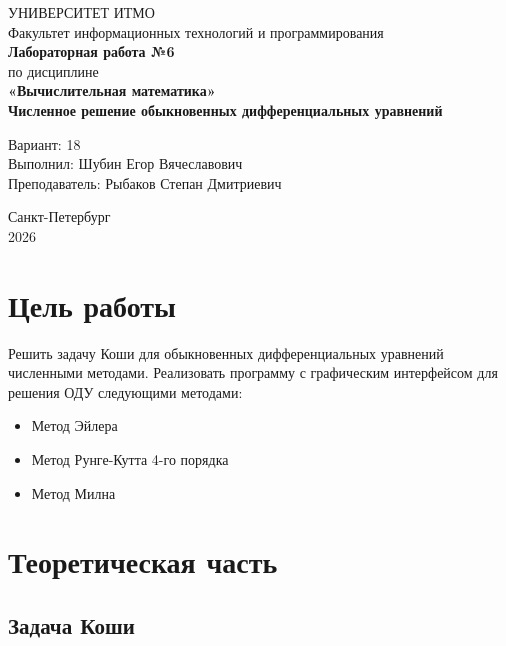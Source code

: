 \documentclass[12pt,a4paper]{article}
\begin{document}
\begin{titlepage}
    \centering
    \vspace*{2cm}
    
    {\Large УНИВЕРСИТЕТ ИТМО}\\[0.5cm]
    {\large Факультет информационных технологий и программирования}\\[2cm]
    
    {\LARGE \textbf{Лабораторная работа №6}}\\[0.5cm]
    {\Large по дисциплине}\\[0.3cm]
    {\Large \textbf{«Вычислительная математика»}}\\[1cm]
    
    {\Large \textbf{Численное решение обыкновенных дифференциальных уравнений}}\\[3cm]
    
    \begin{flushright}
        {\large Вариант: 18}\\[0.5cm]
        {\large Выполнил: Шубин Егор Вячеславович}\\[0.3cm]
        {\large Преподаватель: Рыбаков Степан Дмитриевич}\\[2cm]
    \end{flushright}
    
    \vfill
    
    {\large Санкт-Петербург}\\
    {\large 2026}
\end{titlepage}

\section{Цель работы}

Решить задачу Коши для обыкновенных дифференциальных уравнений численными методами. Реализовать программу с графическим интерфейсом для решения ОДУ следующими методами:
\begin{itemize}
    \item Метод Эйлера 
    \item Метод Рунге-Кутта 4-го порядка
    \item Метод Милна 
\end{itemize}

\section{Теоретическая часть}

\subsection{Задача Коши}
\end{document}
